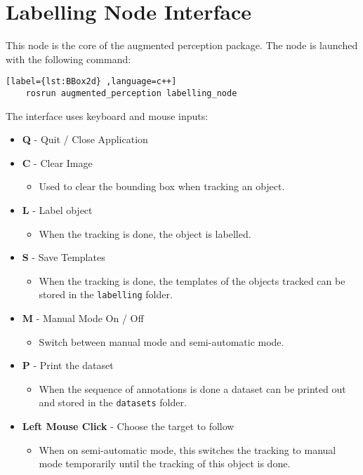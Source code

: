 \section{Labelling Node Interface}

This node is the core of the augmented perception package. The node is launched with the following command:

\begin{center}
	\begin{lstlisting}[label={lst:BBox2d} ,language=c++]
	rosrun augmented_perception labelling_node\end{lstlisting}
\end{center}

The interface uses keyboard and mouse inputs:

\begin{itemize}
	\item \textbf{Q} - Quit / Close Application
	\item \textbf{C} - Clear Image
	\begin{itemize}
		\item Used to clear the bounding box when tracking an object.
	\end{itemize}
	\item \textbf{L} - Label object
	\begin{itemize}
		\item When the tracking is done, the object is labelled.
	\end{itemize}
	\item \textbf{S} - Save Templates
	\begin{itemize}
		\item When the tracking is done, the templates of the objects tracked can be stored in the \texttt{labelling} folder.
	\end{itemize}
	\item \textbf{M} - Manual Mode On / Off
	\begin{itemize}
		\item Switch between manual mode and semi-automatic mode.
	\end{itemize}
	\item \textbf{P} - Print the dataset
	\begin{itemize}
		\item When the sequence of annotations is done a dataset can be printed out and stored in the \texttt{datasets} folder.
	\end{itemize}
	\item \textbf{Left Mouse Click} - Choose the target to follow
	\begin{itemize}
		\item When on semi-automatic mode, this switches the tracking to manual mode temporarily until the tracking of this object is done.
	\end{itemize}
\end{itemize}

